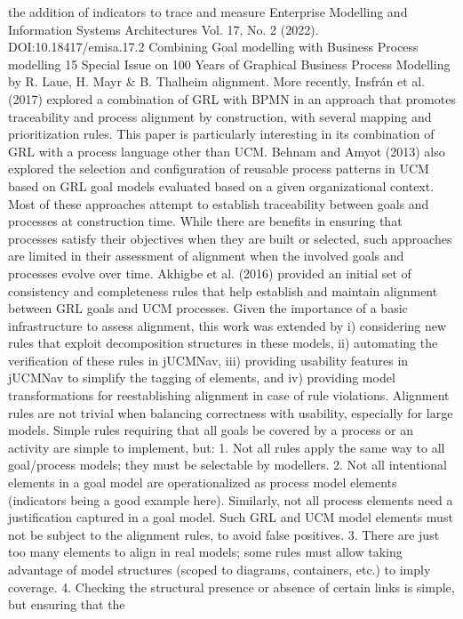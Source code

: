 the addition of indicators to trace and measure
Enterprise Modelling and Information Systems Architectures
Vol. 17, No. 2 (2022). DOI:10.18417/emisa.17.2
Combining Goal modelling with Business Process modelling 15
Special Issue on 100 Years of Graphical Business Process Modelling by R. Laue, H. Mayr & B. Thalheim
alignment. More recently, Insfrán et al. (2017)
explored a combination of GRL with BPMN in an
approach that promotes traceability and process
alignment by construction, with several mapping
and prioritization rules. This paper is particularly interesting in its combination of GRL with a
process language other than UCM. Behnam and
Amyot (2013) also explored the selection and configuration of reusable process patterns in UCM
based on GRL goal models evaluated based on a
given organizational context.
Most of these approaches attempt to establish
traceability between goals and processes at construction time. While there are benefits in ensuring
that processes satisfy their objectives when they
are built or selected, such approaches are limited
in their assessment of alignment when the involved
goals and processes evolve over time.
Akhigbe et al. (2016) provided an initial set
of consistency and completeness rules that help
establish and maintain alignment between GRL
goals and UCM processes. Given the importance
of a basic infrastructure to assess alignment, this
work was extended by i) considering new rules
that exploit decomposition structures in these models, ii) automating the verification of these rules
in jUCMNav, iii) providing usability features in
jUCMNav to simplify the tagging of elements,
and iv) providing model transformations for reestablishing alignment in case of rule violations.
Alignment rules are not trivial when balancing
correctness with usability, especially for large
models. Simple rules requiring that all goals be
covered by a process or an activity are simple to
implement, but:
1. Not all rules apply the same way to all goal/process models; they must be selectable by modellers.
2. Not all intentional elements in a goal model are
operationalized as process model elements (indicators being a good example here). Similarly,
not all process elements need a justification
captured in a goal model. Such GRL and UCM
model elements must not be subject to the alignment rules, to avoid false positives.
3. There are just too many elements to align in real
models; some rules must allow taking advantage of model structures (scoped to diagrams,
containers, etc.) to imply coverage.
4. Checking the structural presence or absence
of certain links is simple, but ensuring that the
